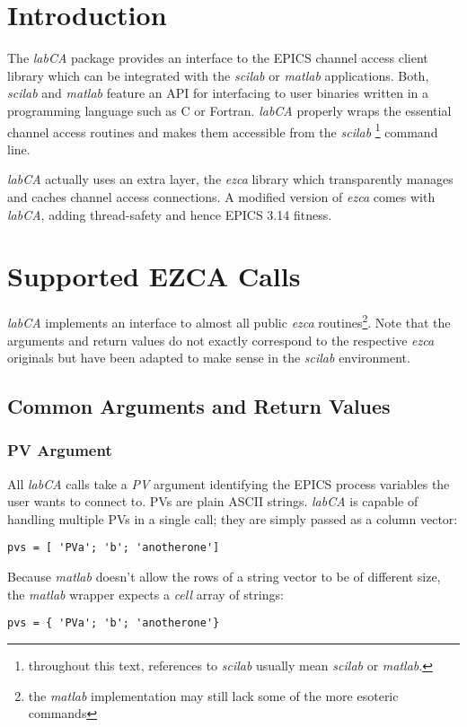 \documentclass{article}
\newcommand{\sca}{{\em labCA}}
\newcommand{\scilab}{{\em scilab}}
\newcommand{\matlab}{{\em matlab}}
\newcommand{\ezca}{{\em ezca}}
\begin{document}
\section{Introduction}
The \sca{} package provides an interface to the
EPICS channel access client library which can be
integrated with the \scilab{} or \matlab{} applications.
Both, \scilab{} and \matlab{} feature an API for interfacing
to user binaries written in a programming language such
as C or Fortran. \sca{} properly wraps the essential
channel access routines and makes them accessible
from the \scilab%
\footnote{throughout this text, references to \scilab{}
usually mean \scilab{} or \matlab.}
command line.

\sca{} actually uses an extra layer, the \ezca{} library
which transparently manages and caches channel access 
connections. A modified version of \ezca{} comes with
\sca, adding thread-safety and hence EPICS 3.14 fitness.

\section{Supported EZCA Calls}
\sca{} implements an interface to almost all public
\ezca{} routines\footnote{%
the \matlab{} implementation may still lack some of the
more esoteric commands}. Note that the arguments and
return values do not exactly correspond to the respective
\ezca{} originals but have been adapted to make sense
in the  \scilab{} environment.

\subsection{Common Arguments and Return Values}
\subsubsection{PV Argument}
All \sca{} calls take a {\em PV} argument identifying
the EPICS process variables the user wants to connect to.
PVs are plain ASCII strings. \sca{} is capable of handling
multiple PVs in a single call; they are simply passed as a
column vector:
\begin{verbatim}
pvs = [ 'PVa'; 'b'; 'anotherone']
\end{verbatim}
Because \matlab{} doesn't allow the rows of
a string vector to be of different size, the \matlab{}
wrapper expects a {\em cell} array of strings:
\begin{verbatim}
pvs = { 'PVa'; 'b'; 'anotherone'}
\end{verbatim}
\end{document}

